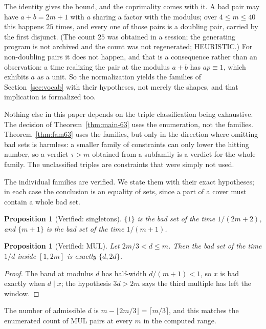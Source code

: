\documentclass[11pt]{amsart}
\theoremstyle{plain}
\newtheorem{proposition}[theorem]{Proposition}
\theoremstyle{definition}
\begin{document}
The identity gives the bound, and the coprimality comes with it. A bad pair may have
$a+b = 2m+1$ with $a$ sharing a factor with the modulus; over $4 \le m \le 40$ this happens $25$
times, and every one of those pairs is a doubling pair, carried by the first disjunct. (The count $25$ was obtained in a session; the generating program is not archived and the count was not regenerated; HEURISTIC.) For
non-doubling pairs it does not happen, and that is a consequence rather than an observation: a time
realizing the pair at the modulus $a+b$ has $ap \equiv 1$, which exhibits $a$ as a unit. So the
normalization yields the families of Section~\ref{sec:vocab} with their hypotheses, not merely the
shapes, and that implication is formalized too.

Nothing else in this paper depends on the triple classification being exhaustive. The decision of
Theorem~\ref{thm:main-63} uses the enumeration, not the families. Theorem~\ref{thm:fam63} uses the
families, but only in the direction where omitting bad sets is harmless: a smaller family of
constraints can only lower the hitting number, so a verdict $\tau > m$ obtained from a subfamily is
a verdict for the whole family. The unclassified triples are constraints that were simply not used.

The individual families are verified. We state them with their exact hypotheses; in each case the
conclusion is an equality of sets, since a part of a cover must contain a whole bad set.

\begin{proposition}[Verified: singletons]
$\{1\}$ is the bad set of the time $1/(2m+2)$, and $\{m+1\}$ is the bad set of the time $1/(m+1)$.
\end{proposition}

\begin{proposition}[Verified: MUL]\label{prop:mul}
Let $2m/3 < d \le m$. Then the bad set of the time $1/d$ inside $[1,2m]$ is exactly $\{d, 2d\}$.
\end{proposition}

\begin{proof}
The band at modulus $d$ has half-width $d/(m+1) < 1$, so $x$ is bad exactly when $d \mid x$; the
hypothesis $3d > 2m$ says the third multiple has left the window.
\end{proof}

The number of admissible $d$ is $m - \lfloor 2m/3 \rfloor = \lceil m/3 \rceil$, and this matches the
enumerated count of MUL pairs at every $m$ in the computed range.
\end{document}
